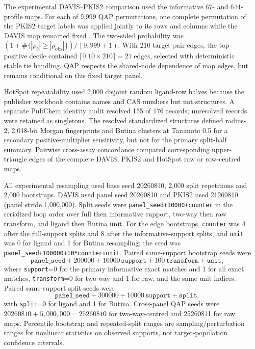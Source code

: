 The experimental DAVIS--PKIS2 comparison used the informative 67- and
644-profile maps.  For each of 9,999 QAP permutations, one complete permutation
of the PKIS2 target labels was applied jointly to its rows and columns while the
DAVIS map remained fixed \cite{hubert1976}.  The two-sided probability was
$(1+\#\{|\rho_b|\geq|\rho_{\mathrm{obs}}|\})/(9,999+1)$.  With 210 target-pair
edges, the top positive decile contained $\lceil0.10\times210\rceil=21$ edges,
selected with deterministic stable tie handling.  QAP respects the shared-node
dependence of map edges, but remains conditional on this fixed target panel.

HotSpot repeatability used 2,000 disjoint random ligand-row halves because the
publisher workbook contains names and CAS numbers but not structures. A
separate PubChem identity audit resolved 155 of 176 records; unresolved records
were retained as singletons. The resolved standardized structures defined
radius-2, 2,048-bit Morgan fingerprints and Butina clusters at Tanimoto 0.5 for
a secondary positive-multiplier sensitivity, but not for the primary split-half
summary. Pairwise cross-assay concordance compared corresponding upper-triangle
edges of the complete DAVIS, PKIS2 and HotSpot raw or row-centred maps.

All experimental resampling used base seed 20260810, 2,000 split repetitions
and 2,000 bootstraps.  DAVIS used panel seed 20260810 and PKIS2 used 21260810
(panel stride 1,000,000).  Split seeds were
\texttt{panel\_seed+10000+counter} in the serialized loop order over full then
informative support, two-way then raw transform, and ligand then Butina unit.
For the edge bootstraps, \texttt{counter} was 4 after the full-support splits
and 8 after the informative-support splits, and \texttt{unit} was 0 for ligand
and 1 for Butina resampling; the seed was
\texttt{panel\_seed+100000+10*counter+unit}.  Paired same-support bootstrap seeds
were
\[
\texttt{panel\_seed}+200000+10000\,\texttt{support}
 +100\,\texttt{transform}+\texttt{unit},
\]
where \texttt{support}=0 for the primary informative exact matches and 1 for all
exact matches, \texttt{transform}=0 for two-way and 1 for raw, and the same unit
indices.  Paired same-support split seeds were
\[
\texttt{panel\_seed}+300000+10000\,\texttt{support}+\texttt{split},
\]
with \texttt{split}=0 for ligand and 1 for Butina.  Cross-panel QAP seeds were
$20260810+5{,}000{,}000=25260810$ for two-way-centred and 25260811 for raw
maps.  Percentile bootstrap and repeated-split ranges are
sampling/perturbation ranges for nonlinear statistics on observed supports, not
target-population confidence intervals.

